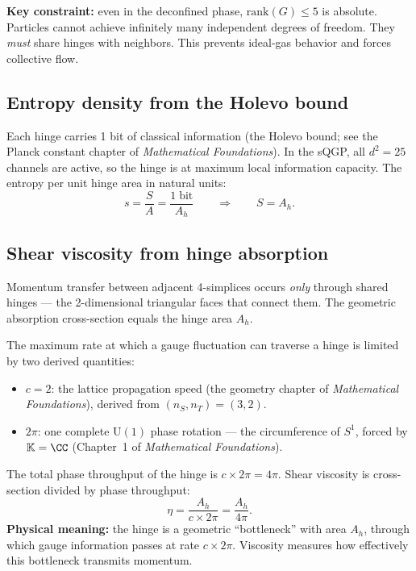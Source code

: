 \textbf{Key constraint:} even in the deconfined phase, $\text{rank}(G) \leq 5$ is absolute. Particles cannot achieve infinitely many independent degrees of freedom. They \emph{must} share hinges with neighbors. This prevents ideal-gas behavior and forces collective flow.

\subsection{Entropy density from the Holevo bound}

Each hinge carries 1 bit of classical information (the Holevo bound; see the Planck constant chapter of \textit{Mathematical Foundations}). In the sQGP, all $d^2 = 25$ channels are active, so the hinge is at maximum local information capacity. The entropy per unit hinge area in natural units:
\begin{equation}
s = \frac{S}{A} = \frac{1\;\text{bit}}{A_h} \qquad\Rightarrow\qquad S = A_h.
\end{equation}

\subsection{Shear viscosity from hinge absorption}

Momentum transfer between adjacent 4-simplices occurs \emph{only} through shared hinges --- the 2-dimensional triangular faces that connect them. The geometric absorption cross-section equals the hinge area $A_h$.

The maximum rate at which a gauge fluctuation can traverse a hinge is limited by two derived quantities:
\begin{itemize}
\item $c = 2$: the lattice propagation speed (the geometry chapter of \textit{Mathematical Foundations}), derived from $(n_S, n_T) = (3, 2)$.
\item $2\pi$: one complete $\text{U}(1)$ phase rotation --- the circumference of $S^1$, forced by $\mathbb{K} = \CC$ (Chapter~1 of \textit{Mathematical Foundations}).
\end{itemize}

The total phase throughput of the hinge is $c \times 2\pi = 4\pi$. Shear viscosity is cross-section divided by phase throughput:
\begin{equation}
\eta = \frac{A_h}{c \times 2\pi} = \frac{A_h}{4\pi}.
\end{equation}
\textbf{Physical meaning:} the hinge is a geometric ``bottleneck'' with area $A_h$, through which gauge information passes at rate $c \times 2\pi$. Viscosity measures how effectively this bottleneck transmits momentum.

